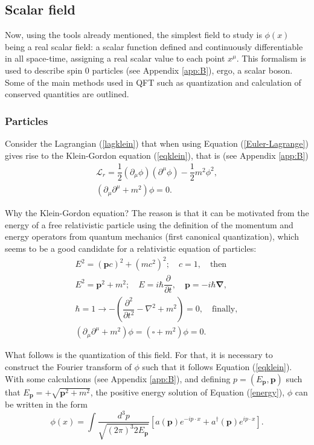 \subsection{Scalar field} \label{ssec:scalarfield}

Now, using the tools already mentioned, the simplest field to study is $\phi(x)$ being a real scalar field: a scalar function defined and continuously differentiable in all space-time, assigning a real scalar value to each point $x^{\mu}$. This formalism is used to describe spin 0 particles (see Appendix \ref{app:B}), ergo, a scalar boson. Some of the main methods used in QFT such as quantization and calculation of conserved quantities are outlined.

\subsubsection{Particles} \label{ssec:particles}

Consider the Lagrangian (\ref{lagklein}) that when using Equation (\ref{Euler-Lagrange}) gives rise to the Klein-Gordon equation (\ref{eqklein}), that is (see Appendix \ref{app:B})
\begin{gather}
\label{lagklein}
    \mathcal{L}_r = \dfrac{1}{2}(\partial_{\mu}\phi)(\partial^{\mu}\phi) - \dfrac{1}{2}m^2\phi^2, \\
\label{eqklein}
    (\partial_{\mu}\partial^{\mu} + m^2)\phi = 0.
\end{gather}

Why the Klein-Gordon equation? The reason is that it can be motivated from the energy of a free relativistic particle using the definition of the momentum and energy operators from quantum mechanics (first canonical quantization), which seems to be a good candidate for a relativistic equation of particles:
\begin{gather}
    E^2 = (\bm{p}c)^2 + (mc^2)^2; \quad c=1, \quad \textrm{then} \nonumber \\
\label{energy}
    E^2 = \bm{p}^2 + m^2; \quad E = i\hbar\dfrac{\partial}{\partial t}, \quad \bm{p} = -i\hbar\bm{\nabla}, \\
    \hbar=1 \rightarrow  -\left(\dfrac{\partial^2}{\partial t^2} - \nabla^2 + m^2\right) = 0, \quad \textrm{finally}, \nonumber \\
    (\partial_{\mu}\partial^{\mu} + m^2)\phi =(\square + m^2)\phi = 0. \nonumber
\end{gather}

What follows is the quantization of this field. For that, it is necessary to construct the Fourier transform of $\phi$ such that it follows Equation (\ref{eqklein}). With some calculations (see Appendix \ref{app:B}), and defining $p=(E_{\bm{p}},\bm{p})$ such that $E_{\bm{p}} = +\sqrt{\bm{p}^2 + m^2}$, the positive energy solution of Equation (\ref{energy}), $\phi$ can be written in the form
\begin{equation}
    \label{scalarfield}
    \phi(x) = \int \dfrac{d^3p}{\sqrt{(2\pi)^{3}2E_{\bm{p}}}} [a(\bm{p})e^{-ip\cdot x} + a^{\dagger}(\bm{p})e^{ip\cdot x}].
\end{equation}

